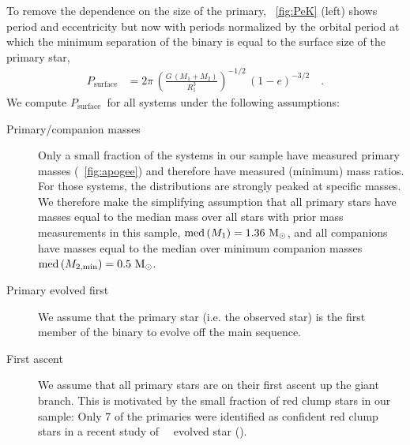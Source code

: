 \documentclass[modern, letterpaper]{aastex62}
\newcommand{\apogee}{\project{\acronym{APOGEE}}}
\newcommand{\DR}{\acronym{DR14}}
\newcommand{\med}[1]{\ensuremath{\textrm{med}\left(#1\right)}}
\newcommand{\Psurf}{\ensuremath{P_\textrm{surface}}}
\begin{document}
To remove the dependence on the size of the primary, \figurename~\ref{fig:PeK}
(left) shows period and eccentricity but now with periods normalized by the
orbital period at which the minimum separation of the binary is equal to the
surface size of the primary star,
\begin{align}
    \Psurf &= 2\pi \,
        \left(\frac{G \, (M_1+M_2)}{R_1^3}\right)^{-1/2} \,
        \left(1-e\right)^{-3/2}
    \quad . \label{eq:Psurf}
\end{align}
We compute \Psurf\ for all systems under the following assumptions:
\begin{description}
    \item[Primary/companion masses] Only a small fraction of the systems in our
    sample have measured primary masses (\figurename~\ref{fig:apogee}) and
    therefore have measured (minimum) mass ratios.
    For those systems, the distributions are strongly peaked at specific masses.
    We therefore make the simplifying assumption that all primary stars have
    masses equal to the median mass over all stars with prior mass measurements
    in this sample, $\med{M_1} = 1.36~\msun$, and all companions have masses
    equal to the median over minimum companion masses $\med{M_{2, \textrm{min}}}
    = 0.5~\msun$.
    \item[Primary evolved first] We assume that the primary star (i.e. the
    observed star) is the first member of the binary to evolve off the main
    sequence.
    \item[First ascent] We assume that all primary stars are on their first
    ascent up the giant branch.
    This is motivated by the small fraction of red clump stars in our sample:
    Only 7 of the primaries were identified as confident red clump stars in a
    recent study of \apogee\ \DR\ evolved star (\citealt{Ting:2018}).
\end{description}
\end{document}
